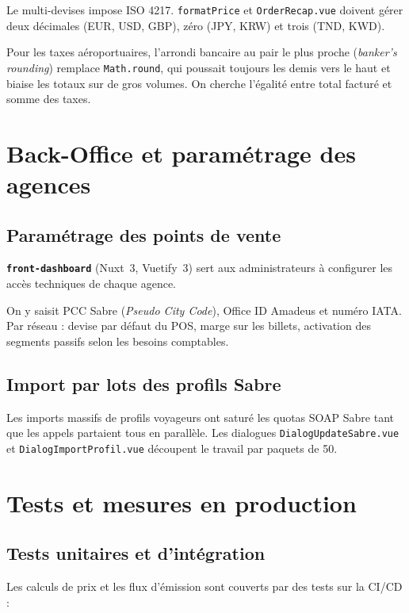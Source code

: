 Le multi-devises impose ISO 4217. \texttt{formatPrice} et \texttt{OrderRecap.vue} doivent gérer deux décimales (EUR, USD, GBP), zéro (JPY, KRW) et trois (TND, KWD).

Pour les taxes aéroportuaires, l'arrondi bancaire au pair le plus proche (\textit{banker's rounding}) remplace \texttt{Math.round}, qui poussait toujours les demis vers le haut et biaise les totaux sur de gros volumes. On cherche l'égalité entre total facturé et somme des taxes.

\chapter{Back-Office et paramétrage des agences}
\label{chap:backoffice_admin}

\section{Paramétrage des points de vente}

\textbf{\texttt{front-dashboard}} (Nuxt~3, Vuetify~3) sert aux administrateurs à configurer les accès techniques de chaque agence.

On y saisit PCC Sabre (\textit{Pseudo City Code}), Office ID Amadeus et numéro IATA. Par réseau : devise par défaut du POS, marge sur les billets, activation des segments passifs selon les besoins comptables.

\section{Import par lots des profils Sabre}

Les imports massifs de profils voyageurs ont saturé les quotas SOAP Sabre tant que les appels partaient tous en parallèle. Les dialogues \texttt{DialogUpdateSabre.vue} et \texttt{DialogImportProfil.vue} découpent le travail par paquets de 50.

\chapter{Tests et mesures en production}
\label{chap:assurance_qualite}

\section{Tests unitaires et d'intégration}

Les calculs de prix et les flux d'émission sont couverts par des tests sur la CI/CD :

